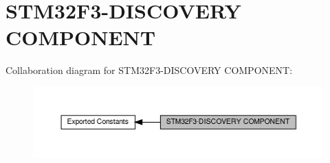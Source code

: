 \hypertarget{group__STM32F3__DISCOVERY__COMPONENT}{}\section{S\+T\+M32\+F3-\/\+D\+I\+S\+C\+O\+V\+E\+RY C\+O\+M\+P\+O\+N\+E\+NT}
\label{group__STM32F3__DISCOVERY__COMPONENT}
Collaboration diagram for S\+T\+M32\+F3-\/\+D\+I\+S\+C\+O\+V\+E\+RY C\+O\+M\+P\+O\+N\+E\+NT\+:\nopagebreak
\begin{figure}[H]
\begin{center}
\leavevmode
\includegraphics[width=350pt]{group__STM32F3__DISCOVERY__COMPONENT}
\end{center}
\end{figure}
